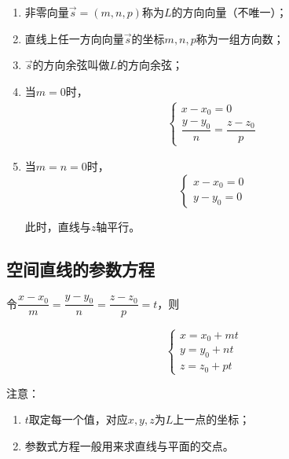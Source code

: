 \documentclass[12pt, a4paper]{article}
\numberwithin{equation}{section}
\begin{document}
    \begin{enumerate}
        \item 非零向量\(\overrightarrow{s} = \left(m, n, p\right)\)称为\(L\)的方向向量（不唯一）；
        \item 直线上任一方向向量\(\overrightarrow{s}\)的坐标\(m, n, p\)称为一组方向数；
        \item \(\overrightarrow{s}\)的方向余弦叫做\(L\)的方向余弦；
        \item 当\(m = 0\)时，
            \begin{align}
                \left\{\begin{array}{l}
                x-x_0=0 \\
                \dfrac{y-y_0}{n}=\dfrac{z-z_0}{p}
                \end{array}\right.
            \end{align}
        \item 当\(m = n = 0\)时，
            \begin{equation}
                \left\{\begin{array}{l}
                x-x_0=0 \\
                y-y_0=0
                \end{array}\right.
            \end{equation}

            此时，直线与\(z\)轴平行。
    \end{enumerate}

\subsection{空间直线的参数方程}

    令$\dfrac{x-x_0}{m}=\dfrac{y-y_0}{n}=\dfrac{z-z_0}{p}=t$，则

    \begin{equation}
        \left\{\begin{array}{l}
        x=x_0+m t \\
        y=y_0+n t \\
        z=z_0+p t
        \end{array}\right.
    \end{equation}

    注意：

    \begin{enumerate}
        \item \(t\)取定每一个值，对应\(x, y, z\)为\(L\)上一点的坐标；
        \item 参数式方程一般用来求直线与平面的交点。
    \end{enumerate}
\end{document}

